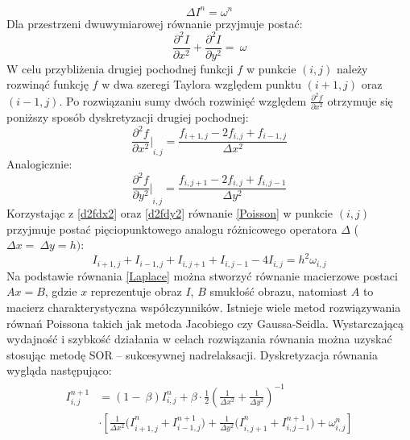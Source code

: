 \documentclass[12pt, twoside, openany]{report}
\theoremstyle{definition}
\begin{document}
\begin{equation}
\Delta I^n={\omega }^n
\label{Poisson}
\end{equation}
Dla przestrzeni dwuwymiarowej równanie przyjmuje postać:
\begin{equation}
\frac{{\partial }^2I}{\partial x^2}+\frac{{\partial }^2I}{\partial y^2}=\ \omega
\label{Poisson2D}
\end{equation}
W celu przybliżenia drugiej pochodnej funkcji $f$ w punkcie $(i,j)$ należy rozwinąć funkcję $f$ w dwa szeregi Taylora względem punktu $(i+1,j)$ oraz $(i-1,j)$. Po rozwiązaniu sumy dwóch rozwinięć względem $\frac{{\partial }^2f}{\partial x^2}$ otrzymuje się poniższy sposób dyskretyzacji drugiej pochodnej:
\begin{equation}
{\frac{{\partial }^2f}{\partial x^2}\mathrm{|}}_{i,j}\mathrm{=}\frac{f_{i+1,j}-2f_{i,j}+f_{i-1,j}}{\Delta x^2}
\label{d2fdx2}
\end{equation}
Analogicznie:
\begin{equation}
{\frac{{\partial }^2f}{\partial y^2}\mathrm{|}}_{i,j}\mathrm{=}\frac{f_{i,j+1}-2f_{i,j}+f_{i,j-1}}{\Delta y^2}
\label{d2fdy2}
\end{equation}
Korzystając z \eqref{d2fdx2} oraz \eqref{d2fdy2} równanie \eqref{Poisson} w punkcie $(i,j)$ przyjmuje postać pięciopunktowego analogu różnicowego operatora $\Delta $ ($\Delta x=\ \Delta y=h)$:
\begin{equation}
I_{i+1,j}+I_{i-1,j}+I_{i,j+1}+I_{i,j-1}-4I_{i,j}=h^2{\omega }_{i,j}
\label{Laplace}
\end{equation}
Na podstawie równania \eqref{Laplace} można stworzyć równanie macierzowe postaci $Ax=B$, gdzie $x$ reprezentuje obraz $I$, $B$ smukłość obrazu, natomiast $A$ to macierz charakterystyczna współczynników. Istnieje wiele metod rozwiązywania równań Poissona takich jak metoda Jacobiego czy Gaussa-Seidla.  Wystarczającą wydajność i szybkość działania w celach rozwiązania równania można uzyskać stosując metodę SOR – sukcesywnej nadrelaksacji. Dyskretyzacja równania wygląda następująco:
\begin{align}
\begin{aligned}
I^{n+1}_{i,j}
&= \left(1-\ \beta \right)I^n_{i,j}+\beta \cdot \frac{1}{2}{\left(\frac{1}{\Delta x^2}+\frac{1}{\Delta y^2}\right)}^{-1}\\[1ex]
&\cdot \left[\frac{1}{\Delta x^2}{(I}^n_{i+1,j}+I^{n+1}_{i-1,j})+\frac{1}{\Delta y^2}{(I}^n_{i,j+1}+I^{n+1}_{i,j-1})+{\omega }^n_{i,j}\right]
\end{aligned}
\label{DiscreteSOR}
\end{align}
\end{document}
